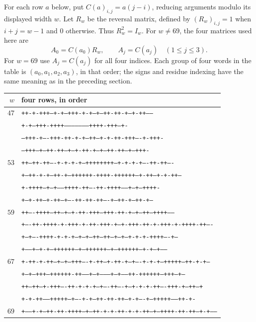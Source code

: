 \documentclass[10pt]{article}
\begin{document}
For each row $a$ below, put $C(a)_{i,j}=a(j-i)$, reducing arguments
modulo its displayed width $w$. Let $R_w$ be the reversal matrix, defined
by $(R_w)_{i,j}=1$ when $i+j=w-1$ and $0$ otherwise. Thus $R_w^2=I_w$.
For $w\ne69$, the four matrices used here are
\[
 A_0=C(a_0)R_w,\qquad A_j=C(a_j)\quad(1\le j\le3).
\]
For $w=69$ use $A_j=C(a_j)$ for all four indices. Each group of four
words in the table is $(a_0,a_1,a_2,a_3)$, in that order; the signs and
residue indexing have the same meaning as in the preceding section.

\begin{center}\fontsize{5}{6}\selectfont
\begin{tabular}{rl}
$w$&four rows, in order\\\hline
$47$&\texttt{++-+-+++---+-+--+++-+-+---+--++-++-+--+-++-----}\\
&\texttt{+-+---+++-++++--------------------++++-+++---+-}\\
&\texttt{--+++-+----+++-++-+-+--++--+-+-++-+++----+-+++-}\\
&\texttt{--+++--+--++-++---+--+-++-+--+---++-++--+--+++-}\\
\hline
$53$&\texttt{++---++-++----+-+-+-+--++++++++--+-+-+-+----++-++----}\\
&\texttt{+---++-+-+--++-+--++++++-++++-++++++--+-++--+-+-++---}\\
&\texttt{+-++++--+---+-----++++-++----++-++++-----+---+--++++-}\\
&\texttt{+---+-++---+-++---+----++-++-++----+---++-+---++-+---}\\
\hline
$59$&\texttt{++----++++---++--+---+-++-+++--+++-++-+---+--++---++++-----}\\
&\texttt{+----++-++++-+-+++-+-++-+++-+--+-+++-++-+-+++-+-++++-++----}\\
&\texttt{+--+----++++-+-+-+--+--+---++--++---+--+--+-+-+-++++----+--}\\
&\texttt{+-----+---+-+--++++++--+---++++++---+--++++++--+-+---+-----}\\
\hline
$67$&\texttt{+-++-+-++--+---+--+++----+-++--+-++-+--+----+-+-+--+++++--++-+-+---}\\
&\texttt{+--+--+++--++++++-++-----+---+--------+---+-----++-++++++--+++--+--}\\
&\texttt{++--++---+-+++----++-+-+-+--+----++----+--+-+-+-++----+++-+---++--+}\\
&\texttt{+-+-++------+++++---+----+-+--++-++-++--+-+----+---+++++------++-+-}\\
\hline
$69$&\texttt{+-----+-+--++-++-++++---+--++-+-+-++-+-+-++--+---++++-++-++--+-+-----}\\

\end{tabular}
\end{center}
\end{document}
